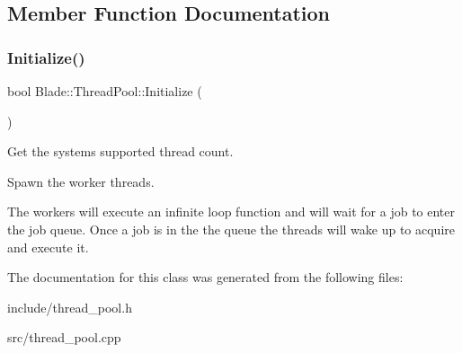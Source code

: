 \subsection{Member Function Documentation}
\mbox{\label{class_blade_1_1_thread_pool_a47f7b1929e59c4be260f1616a7340ca7}} 
\subsubsection{\texorpdfstring{Initialize()}{Initialize()}}
{\footnotesize\ttfamily bool Blade\+::\+Thread\+Pool\+::\+Initialize (\begin{DoxyParamCaption}{ }\end{DoxyParamCaption})}

Get the system\textquotesingle{}s supported thread count.

Spawn the worker threads.

The workers will execute an infinite loop function and will wait for a job to enter the job queue. Once a job is in the the queue the threads will wake up to acquire and execute it.

The documentation for this class was generated from the following files\+:\begin{DoxyCompactItemize}
\item 
include/thread\+\_\+pool.\+h\item 
src/thread\+\_\+pool.\+cpp\end{DoxyCompactItemize}
